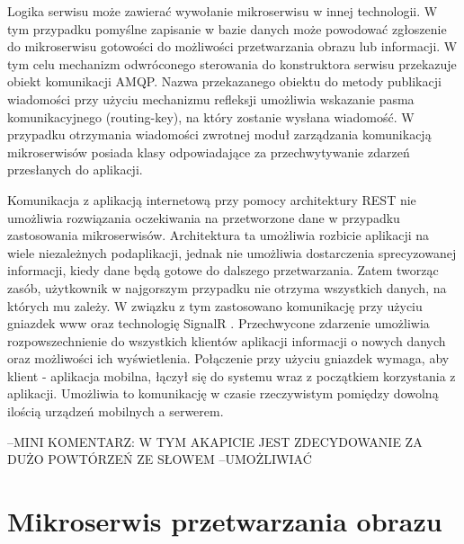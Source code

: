 {Logika serwisu może zawierać wywołanie mikroserwisu w innej technologii. W tym przypadku pomyślne zapisanie w bazie danych może powodować zgłoszenie do mikroserwisu gotowości do możliwości przetwarzania obrazu lub informacji. W tym celu mechanizm odwróconego sterowania do konstruktora serwisu przekazuje obiekt komunikacji AMQP. Nazwa przekazanego obiektu do metody publikacji wiadomości przy użyciu mechanizmu refleksji umożliwia wskazanie pasma komunikacyjnego (routing-key), na który zostanie wysłana wiadomość. W przypadku otrzymania wiadomości zwrotnej moduł zarządzania komunikacją mikroserwisów posiada klasy odpowiadające za przechwytywanie zdarzeń przesłanych do aplikacji. 

Komunikacja z aplikacją internetową przy pomocy architektury REST nie umożliwia rozwiązania oczekiwania na przetworzone dane w przypadku zastosowania mikroserwisów. Architektura ta umożliwia rozbicie aplikacji na wiele niezależnych podaplikacji, jednak nie umożliwia dostarczenia sprecyzowanej informacji, kiedy dane będą gotowe do dalszego przetwarzania. Zatem tworząc zasób, użytkownik w najgorszym przypadku nie otrzyma wszystkich danych, na których mu zależy. W związku z tym zastosowano komunikację przy użyciu gniazdek www oraz technologię SignalR \cite{SignalR}. Przechwycone zdarzenie umożliwia rozpowszechnienie do wszystkich klientów aplikacji informacji o nowych danych oraz możliwości ich wyświetlenia. Połączenie przy użyciu gniazdek wymaga, aby klient - aplikacja mobilna, łączył się do systemu wraz z początkiem korzystania z aplikacji. Umożliwia to komunikację w czasie rzeczywistym pomiędzy dowolną ilością urządzeń mobilnych a serwerem.
} --MINI KOMENTARZ: W TYM AKAPICIE JEST ZDECYDOWANIE ZA DUŻO POWTÓRZEŃ ZE SŁOWEM
  --UMOŻLIWIAĆ

\section{Mikroserwis przetwarzania obrazu}

{ }

